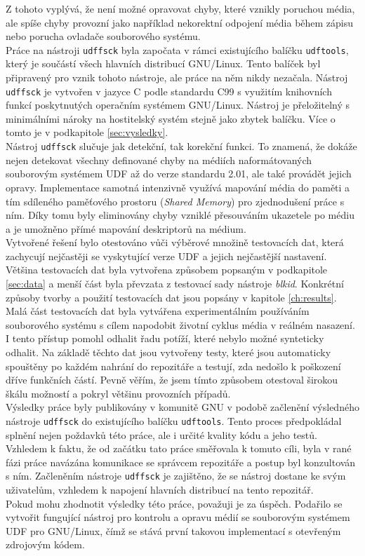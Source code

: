 Z tohoto vyplývá, že není možné opravovat chyby, které vznikly poruchou média, ale spíše chyby provozní jako například nekorektní odpojení média během zápisu nebo porucha ovladače souborového systému.\\
Práce na nástroji \texttt{udffsck} byla započata v rámci existujícího balíčku \texttt{udftools}, který je součástí všech hlavních distribucí GNU/Linux. Tento balíček byl připravený pro vznik tohoto nástroje, ale práce na něm nikdy nezačala. Nástroj \texttt{udffsck} je vytvořen v jazyce C podle standardu C99 s využitím knihovních funkcí poskytnutých operačním systémem \mbox{GNU/Linux}. Nástroj je přeložitelný s minimálními nároky na hostitelský systém stejně jako zbytek balíčku. Více o tomto je v podkapitole \ref{sec:vysledky}.\\
Nástroj \texttt{udffsck} slučuje jak detekční, tak korekční funkci. To znamená, že dokáže nejen detekovat všechny definované chyby na médiích naformátovaných souborovým systémem UDF až do verze standardu 2.01, ale také provádět jejich opravy. Implementace samotná intenzivně využívá mapování média do paměti a tím sdíleného paměťového prostoru (\textit{Shared Memory}) pro zjednodušení práce s ním. Díky tomu byly eliminovány chyby vzniklé přesouváním ukazetele po médiu a je umožněno přímé mapování deskriptorů na médium.\\
Vytvořené řešení bylo otestováno vůči výběrové množině testovacích dat, která zachycují nejčastěji se vyskytující verze UDF a jejich nejčastější nastavení. Většina testovacích dat byla vytvořena způsobem popsaným v podkapitole \ref{sec:data} a menší část byla převzata z testovací sady nástroje \textit{blkid}. Konkrétní způsoby tvorby a použití testovacích dat jsou popsány v kapitole \ref{ch:results}. Malá část testovacích dat byla vytvářena experimentálním používáním souborového systému s cílem napodobit životní cyklus média v reálném nasazení. I tento přístup pomohl odhalit řadu potíží, které nebylo možné synteticky odhalit. Na základě těchto dat jsou vytvořeny testy, které jsou automaticky spouštěny po každém nahrání do repozitáře a testují, zda nedošlo k poškození dříve funkčních částí. Pevně věřím, že jsem tímto způsobem otestoval širokou škálu možností a pokryl většinu provozních případů.\\
Výsledky práce byly publikovány v komunitě GNU v podobě začlenění výsledného nástroje \texttt{udffsck} do existujícího balíčku \texttt{udftools}. Tento proces předpokládal splnění nejen poždavků této práce, ale i určité kvality kódu a jeho testů. Vzhledem k faktu, že od začátku tato práce směřovala k tomuto cíli, byla v rané fázi práce navázána komunikace se správcem repozitáře a postup byl konzultován s ním. Začleněním nástroje \texttt{udffsck} je zajištěno, že se nástroj dostane ke svým uživatelům, vzhledem k napojení hlavních distribucí na tento repozitář.\\
Pokud mohu zhodnotit výsledky této práce, považuji je za úspěch. Podařilo se vytvořit fungující nástroj pro kontrolu a opravu médií se souborovým systémem UDF pro GNU/Linux, čímž se stává první takovou implementací s otevřeným zdrojovým kódem.
